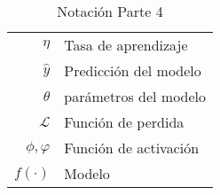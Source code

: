 \begin{table}[H]
\begin{center}
\begin{tabularx}{\textwidth}{|r|X|}
            $ \eta $                                   & Tasa de aprendizaje                                                                                                                                                             \\
            $ \hat{y} $                                & Predicción del modelo                                                                                                                                                           \\
            $ \theta $                                 & parámetros del modelo                                                                                                                                                           \\
            $ \mathcal{L} $                            & Función de perdida                                                                                                                                                              \\
            $ \phi ,\varphi $                          & Función de activación                                                                                                                                                           \\
            $ f\left(\cdot\right) $                    & Modelo                                                                                                                                                                          \\

            \hline
        \end{tabularx}
        \caption{Notación Parte 4}
        \label{tab:nnotation-part-4}
    \end{center}
\end{table}

